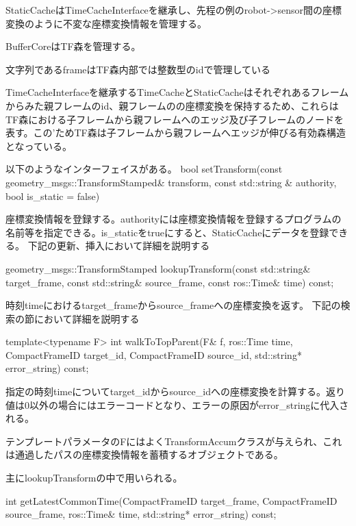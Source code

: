 \documentclass[a4paper]{jreport}	%
\begin{document}




StaticCacheはTimeCacheInterfaceを継承し、先程の例のrobot->sensor間の座標変換のように不変な座標変換情報を管理する。


BufferCoreはTF森を管理する。

文字列であるframeはTF森内部では整数型のidで管理している

TimeCacheInterfaceを継承するTimeCacheとStaticCacheはそれぞれあるフレームからみた親フレームのid、親フレームのの座標変換を保持するため、これらはTF森における子フレームから親フレームへのエッジ及び子フレームのノードを表す。この’ためTF森は子フレームから親フレームへエッジが伸びる有効森構造となっている。


以下のようなインターフェイスがある。
bool setTransform(const geometry\_msgs::TransformStamped\& transform, const std::string \& authority, bool is\_static = false)

座標変換情報を登録する。authorityには座標変換情報を登録するプログラムの名前等を指定できる。is\_staticをtrueにすると、StaticCacheにデータを登録できる。
下記の更新、挿入において詳細を説明する

geometry\_msgs::TransformStamped lookupTransform(const std::string\& target\_frame, const std::string\& source\_frame, const ros::Time\& time) const;
		   
時刻timeにおけるtarget\_frameからsource\_frameへの座標変換を返す。
下記の検索の節において詳細を説明する


template<typename F> int walkToTopParent(F\& f, ros::Time time, CompactFrameID target\_id, CompactFrameID source\_id, std::string* error\_string) const;


指定の時刻timeについてtarget\_idからsource\_idへの座標変換を計算する。返り値は0以外の場合にはエラーコードとなり、エラーの原因がerror\_stringに代入される。

テンプレートパラメータのFにはよくTransformAccumクラスが与えられ、これは通過したパスの座標変換情報を蓄積するオブジェクトである。

主にlookupTransformの中で用いられる。

int getLatestCommonTime(CompactFrameID target\_frame, CompactFrameID source\_frame, ros::Time\& time, std::string* error\_string) const;
\end{document}
